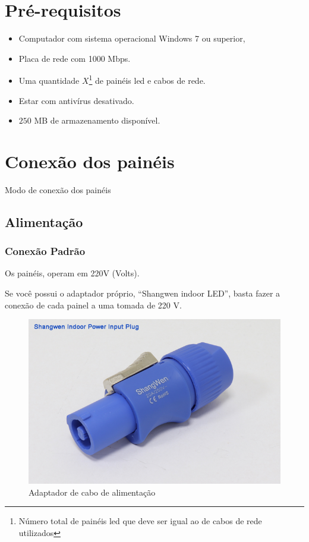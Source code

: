 \documentclass[12pt, a4paper]{article}
\begin{document}
\section{Pré-requisitos}\label{Pré-requisitos}
\begin{itemize}
	\item Computador com sistema operacional Windows 7 ou superior,	
	\item Placa de rede com 1000 Mbps.
	\item Uma quantidade $X$\footnote{Número total de painéis led que deve ser igual ao de cabos de rede utilizados} de painéis led e cabos de rede.
	\item Estar com antivírus desativado.
	\item $250$ MB de armazenamento disponível.
\end{itemize}

\cleardoublepage
\section{Conexão dos painéis}\label{Conexão dos painéis}
Modo de conexão dos painéis

\subsection{Alimentação}\label{Alimentação}
\subsubsection{Conexão Padrão}\label{Conexão Padrão}
Os painéis, operam em 220V (Volts).

Se você possui o adaptador próprio, ``Shangwen indoor LED'', basta fazer a conexão de cada painel a uma tomada de 220 V.
\begin{figure}[!htb]
	\centering
	\includegraphics[width=\textwidth]{caboAlimentacao.png}
	\caption{\label{fig:caboAlimentacao.png}Adaptador de cabo de alimentação}
\end{figure}
\end{document}
